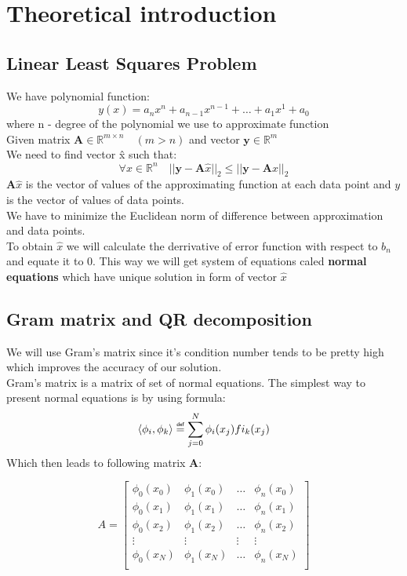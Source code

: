 \section{Theoretical introduction}
\subsection{Linear Least Squares Problem}
We have polynomial function:
\[ y(x) = a_nx^n + a_{n-1}x^{n-1} + \dots + a_1x^1 + a_0 \]
where n - degree of the polynomial we use to approximate function \\
Given matrix $\mathbf{A} \in \mathbb{R}^{m \times n} \quad (m > n)$ and vector $\mathbf{y} \in \mathbb{R}^m$ \\
We need to find vector \^{x} such that:
\[ 	\forall x \in \mathbb{R}^n \quad|| \mathbf{y} - \mathbf{A} \hat{x} ||_2 \leq || \mathbf{y} - \mathbf{A}x ||_2  \]
$\mathbf{A}\hat{x}$ is the vector of values of the approximating function at each data point and $y$ is the vector of values of data points. \\
We have to minimize the Euclidean norm of difference between approximation and data points. \\
To obtain $\hat{x}$ we will calculate the derrivative of error function with respect to $b_n$ and equate it to 0. This way we will get system of equations caled \textbf{normal equations} which have unique solution in form of vector $\hat{x}$

\subsection{Gram matrix and QR decomposition}
We will use Gram's matrix since it's condition number tends to be pretty high which improves the accuracy of our solution. \\
Gram's matrix is a matrix of set of normal equations. The simplest way to present normal equations is by using formula:
\[ \langle \phi_i, \phi_k \rangle \myeq \sum_{j=0}^N \phi_i(x_j)fi_k(x_j) \]
Which then leads to following matrix \textbf{A}:

\[
A = \begin{bmatrix}
\phi_0(x_0) & \phi_1(x_0) &  \dots & \phi_n(x_0) \\
\phi_0(x_1) & \phi_1(x_1) & \dots & \phi_n(x_1) \\
\phi_0(x_2) & \phi_1(x_2) & \dots & \phi_n(x_2) \\
\vdots & \vdots & \vdots & \vdots \\
\phi_0(x_N) & \phi_1(x_N) & \dots & \phi_n(x_N) \\
\end{bmatrix}
\]

